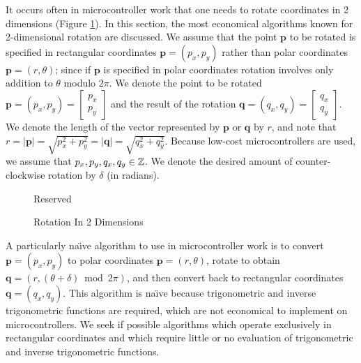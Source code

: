 It occurs often in microcontroller work that one needs to rotate
coordinates in 2 dimensions (Figure \ref{fig:cdta0:srtr2:01}).  In this section,
the most economical algorithms known for 2-dimensional
rotation are discussed.  We assume that the
point $\mathbf{p}$ to be rotated is specified in rectangular coordinates
$\mathbf{p} = (p_x, p_y)$ rather than polar coordinates 
$\mathbf{p} = (r, \theta)$; since if $\mathbf{p}$ is specified in polar coordinates
rotation involves only addition to $\theta$ modulo $2\pi$.  We denote the point to be
rotated $\mathbf{p} = (p_x, p_y) = \left[\begin{array}{c}p_x\\p_y\end{array}\right]$ 
and the result of the rotation 
$\mathbf{q} = (q_x, q_y) = \left[\begin{array}{c}q_x\\q_y\end{array}\right]$.
We denote the length of the vector represented by $\mathbf{p}$ or $\mathbf{q}$
by $r$, and note that 
$r = |\mathbf{p}| = \sqrt{p_x^2 + p_y^2} = |\mathbf{q}| = \sqrt{q_x^2 + q_y^2}$.
Because low-cost microcontrollers are used, we assume that
$p_x, p_y, q_x, q_y \in {\mathbb{Z}}$.
We denote the desired amount of counter-clockwise rotation by $\delta$ (in radians).

\begin{figure}
\begin{huge}
\begin{center}
Reserved
\end{center}
\end{huge}
\caption{Rotation In 2 Dimensions}
\label{fig:cdta0:srtr2:01}
\end{figure}

A particularly na\"{\i}ve algorithm to use in microcontroller work is to 
convert $\mathbf{p} = (p_x, p_y)$ to polar coordinates
$\mathbf{p} = (r, \theta)$, rotate to obtain 
$\mathbf{q} = (r, (\theta + \delta) \bmod 2\pi)$, and then convert back to 
rectangular coordinates $\mathbf{q} = (q_x, q_y)$.  
This algorithm is na\"{\i}ve because trigonometric and
inverse trigonometric functions are required, which are not economical to implement 
on microcontrollers.  We seek if possible algorithms which operate exclusively in
rectangular coordinates and which require little or no evaluation of
trigonometric and inverse trigonometric functions.


